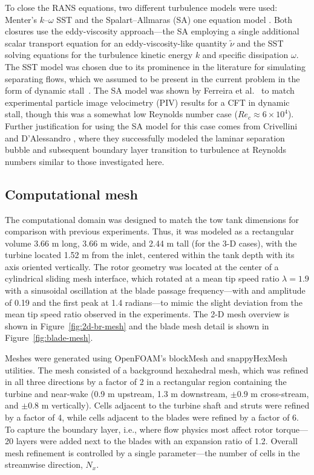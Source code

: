 \documentclass[aip,graphicx]{revtex4-1}
\begin{document}
To close the RANS equations, two different turbulence models were used: Menter's
$k$--$\omega$ SST \cite{Menter1994} and the Spalart--Allmaras (SA) one equation
model \cite{Spalart1992}. Both closures use the eddy-viscosity approach---the SA
employing a single additional scalar transport equation for an
eddy-viscosity-like quantity $\tilde{\nu}$ and the SST solving equations for the
turbulence kinetic energy $k$ and specific dissipation $\omega$. The SST model
was chosen due to its prominence in the literature for simulating separating
flows, which we assumed to be present in the current problem in the form of
dynamic stall~\cite{Para2002}. The SA model was shown by Ferreira et
al.~\cite{Ferreira2007} to match experimental particle image velocimetry (PIV)
results for a CFT in dynamic stall, though this was a somewhat low Reynolds
number case ($Re_c \approx 6 \times 10^4$). Further justification for using the
SA model for this case comes from Crivellini and D'Alessandro
\cite{Crivellini2014}, where they successfully modeled the laminar separation
bubble and subsequent boundary layer transition to turbulence at Reynolds
numbers similar to those investigated here.


\subsection{Computational mesh}

The computational domain was designed to match the tow tank dimensions for
comparison with previous experiments. Thus, it was modeled as a rectangular
volume 3.66 m long, 3.66 m wide, and 2.44 m tall (for the 3-D cases), with the
turbine located 1.52 m from the inlet, centered within the tank depth with its
axis oriented vertically. The rotor geometry was located at the center of a
cylindrical sliding mesh interface, which rotated at a mean tip speed ratio
$\lambda=1.9$ with a sinusoidal oscillation at the blade passage
frequency---with and amplitude of 0.19 and the first peak at 1.4 radians---to
mimic the slight deviation from the mean tip speed ratio observed in the
experiments. The 2-D mesh overview is shown in Figure~\ref{fig:2d-br-mesh} and
the blade mesh detail is shown in Figure~\ref{fig:blade-mesh}.

Meshes were generated using OpenFOAM's blockMesh and snappyHexMesh utilities.
The mesh consisted of a background hexahedral mesh, which was refined in all
three directions by a factor of 2 in a rectangular region containing the turbine
and near-wake (0.9 m upstream, 1.3 m downstream, $\pm 0.9$ m cross-stream, and
$\pm 0.8$ m vertically). Cells adjacent to the turbine shaft and struts were
refined by a factor of 4, while cells adjacent to the blades were refined by a
factor of 6. To capture the boundary layer, i.e., where flow physics most affect
rotor torque---20 layers were added next to the blades with an expansion ratio
of 1.2. Overall mesh refinement is controlled by a single parameter---the number
of cells in the streamwise direction, $N_x$.
\end{document}

